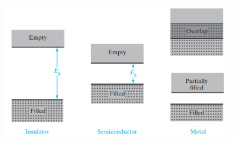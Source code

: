 \documentclass[12pt,a4paper]{article}
\begin{document}
\begin{large}
{\begin{enumerate}
\end{enumerate}

\begin{figure}[H] 
	\centering
	\includegraphics[width = 0.9\textwidth]{energy bands for materials}
	\label{fig:energy bands for materials}
\end{figure}



}
\end{large}
\end{document}
